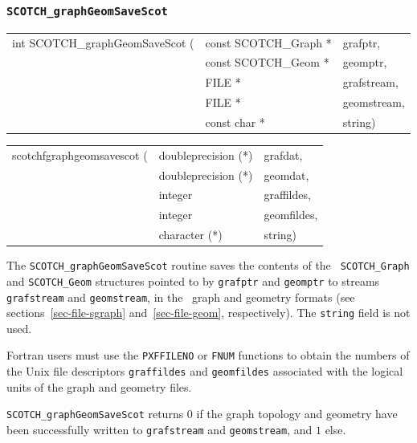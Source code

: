 \subsubsection{{\tt SCOTCH\_graphGeomSaveScot}}

\begin{itemize}
\progsyn

{\tt\begin{tabular}{l@{}ll}
int SCOTCH\_graphGeomSaveScot ( & const SCOTCH\_Graph * & grafptr, \\
                                & const SCOTCH\_Geom *  & geomptr, \\
                                & FILE *                & grafstream, \\
                                & FILE *                & geomstream, \\
                                & const char *          & string)
\end{tabular}}

{\tt\begin{tabular}{l@{}ll}
scotchfgraphgeomsavescot ( & doubleprecision (*) & grafdat, \\
                           & doubleprecision (*) & geomdat, \\
                           & integer             & graffildes, \\
                           & integer             & geomfildes, \\
                           & character (*)       & string)
\end{tabular}}

\progdes

The {\tt SCOTCH\_graphGeomSaveScot} routine saves the contents
of the {\tt
SCOTCH\_\lbt Graph} and {\tt SCOTCH\_\lbt Geom} structures pointed to
by {\tt grafptr} and {\tt geomptr} to streams {\tt graf\lbt stream}
and {\tt geom\lbt stream}, in the \scotch\ graph and geometry
formats (see sections~\ref{sec-file-sgraph} and~\ref{sec-file-geom},
respectively). The {\tt string} field is not used.

Fortran users must use the {\tt PXFFILENO} or {\tt FNUM} functions to
obtain the numbers of the Unix file descriptors {\tt graf\lbt fildes}
and {\tt geom\lbt fildes} associated with the logical units of the
graph and geometry files.

\progret

{\tt SCOTCH\_graphGeomSaveScot} returns $0$ if the graph topology and
geometry have been successfully written to {\tt graf\lbt stream} and
{\tt geom\lbt stream}, and $1$ else.
\end{itemize}

